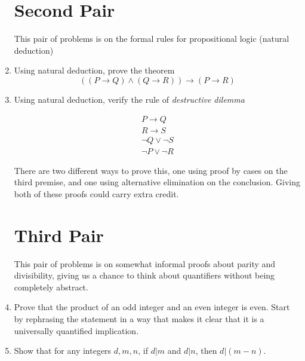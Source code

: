 \documentclass[12pt]{article}
\begin{document}
\begin{enumerate}
\newpage

\section{Second Pair}

This pair of problems is on the formal rules for propositional logic (natural deduction)

\item  Using natural deduction, prove the theorem $$((P \rightarrow Q) \wedge (Q \rightarrow R)) \rightarrow (P \rightarrow R)$$

\newpage

\item  Using natural deduction, verify the rule of {\em destructive dilemma\/}

$$\begin{array}{c}

P \rightarrow Q\\

R \rightarrow S\\

\neg Q \vee \neg S \\ \hline

\neg P \vee \neg R


\end{array}
$$

There are two different ways to prove this, one using proof by cases on the third premise, and one using alternative elimination on the conclusion.
Giving both of these proofs could carry extra credit.

\newpage


\section{Third Pair}

This pair of problems is on somewhat informal proofs about parity and divisibility, giving us a chance to think about quantifiers without being completely abstract.

\item   Prove that the product of an odd integer and an even integer is even.   Start by rephrasing the statement in a way that makes it clear
that it is a universally quantified implication.

\newpage

\item  Show that for any integers $d,m,n$, if $d|m$ and $d|n$, then $d|(m-n)$.

\newpage


\end{enumerate}
\end{document}
